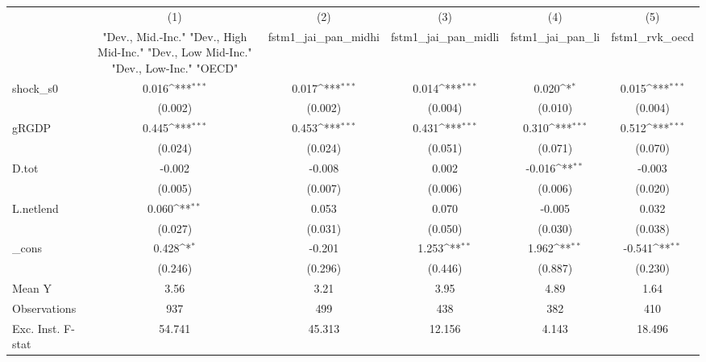 {
\def\sym#1{\ifmmode^{#1}\else\(^{#1}\)\fi}
\begin{tabular}{l*{5}{c}}
\toprule
            &\multicolumn{1}{c}{(1)}&\multicolumn{1}{c}{(2)}&\multicolumn{1}{c}{(3)}&\multicolumn{1}{c}{(4)}&\multicolumn{1}{c}{(5)}\\
            &\multicolumn{1}{c}{ "Dev., Mid.-Inc." "Dev., High Mid-Inc." "Dev., Low Mid-Inc." "Dev., Low-Inc." "OECD" }&\multicolumn{1}{c}{fstm1\_jai\_pan\_midhi}&\multicolumn{1}{c}{fstm1\_jai\_pan\_midli}&\multicolumn{1}{c}{fstm1\_jai\_pan\_li}&\multicolumn{1}{c}{fstm1\_rvk\_oecd}\\
\midrule
shock\_s0    &       0.016\sym{***}&       0.017\sym{***}&       0.014\sym{***}&       0.020\sym{*}  &       0.015\sym{***}\\
            &     (0.002)         &     (0.002)         &     (0.004)         &     (0.010)         &     (0.004)         \\
\addlinespace
gRGDP       &       0.445\sym{***}&       0.453\sym{***}&       0.431\sym{***}&       0.310\sym{***}&       0.512\sym{***}\\
            &     (0.024)         &     (0.024)         &     (0.051)         &     (0.071)         &     (0.070)         \\
\addlinespace
D.tot       &      -0.002         &      -0.008         &       0.002         &      -0.016\sym{**} &      -0.003         \\
            &     (0.005)         &     (0.007)         &     (0.006)         &     (0.006)         &     (0.020)         \\
\addlinespace
L.netlend   &       0.060\sym{**} &       0.053         &       0.070         &      -0.005         &       0.032         \\
            &     (0.027)         &     (0.031)         &     (0.050)         &     (0.030)         &     (0.038)         \\
\addlinespace
\_cons      &       0.428\sym{*}  &      -0.201         &       1.253\sym{**} &       1.962\sym{**} &      -0.541\sym{**} \\
            &     (0.246)         &     (0.296)         &     (0.446)         &     (0.887)         &     (0.230)         \\
\midrule
Mean Y      &        3.56         &        3.21         &        3.95         &        4.89         &        1.64         \\
Observations&         937         &         499         &         438         &         382         &         410         \\
Exc. Inst. F-stat&      54.741         &      45.313         &      12.156         &       4.143         &      18.496         \\
\bottomrule
\end{tabular}
}
